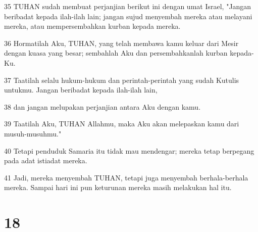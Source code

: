 \par 35 TUHAN sudah membuat perjanjian berikut ini dengan umat Israel, "Jangan beribadat kepada ilah-ilah lain; jangan sujud menyembah mereka atau melayani mereka, atau mempersembahkan kurban kepada mereka.
\par 36 Hormatilah Aku, TUHAN, yang telah membawa kamu keluar dari Mesir dengan kuasa yang besar; sembahlah Aku dan persembahkanlah kurban kepada-Ku.
\par 37 Taatilah selalu hukum-hukum dan perintah-perintah yang sudah Kutulis untukmu. Jangan beribadat kepada ilah-ilah lain,
\par 38 dan jangan melupakan perjanjian antara Aku dengan kamu.
\par 39 Taatilah Aku, TUHAN Allahmu, maka Aku akan melepaskan kamu dari musuh-musuhmu."
\par 40 Tetapi penduduk Samaria itu tidak mau mendengar; mereka tetap berpegang pada adat istiadat mereka.
\par 41 Jadi, mereka menyembah TUHAN, tetapi juga menyembah berhala-berhala mereka. Sampai hari ini pun keturunan mereka masih melakukan hal itu.

\chapter{18}

